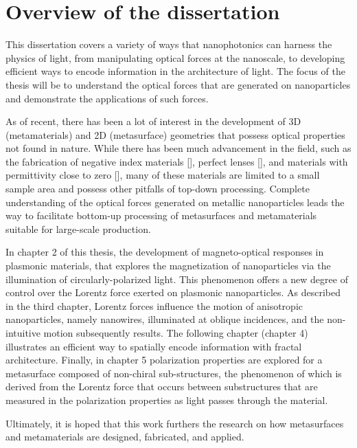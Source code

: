 \section{Overview of the dissertation}
This dissertation covers a variety of ways that nanophotonics can harness the physics of light, from manipulating optical forces at the nanoscale, to developing efficient ways to encode information in the architecture of light. The focus of the thesis will be to understand the optical forces that are generated on nanoparticles and demonstrate the applications of such forces. 

As of recent, there has been a lot of interest in the development of 3D (metamaterials) and 2D (metasurface) geometries that possess optical properties not found in nature. While there has been much advancement in the field, such as the fabrication of negative index materials [\cite{Padilla:2006, Dolling:07, shelby:489}], perfect lenses [\cite{Khorasaninejad:2016, Yang:14, Khorasaninejad1190}], and materials with permittivity close to zero [\cite{JPark:2015c, Alu:07}], many of these materials are limited to a small sample area and possess other pitfalls of top-down processing. Complete understanding of the optical forces generated on metallic nanoparticles leads the way to facilitate bottom-up processing of metasurfaces and metamaterials suitable for large-scale production.

In chapter 2 of this thesis, the development of magneto-optical responses in plasmonic materials, that explores the magnetization of nanoparticles via the illumination of circularly-polarized light. This phenomenon offers a new degree of control over the Lorentz force exerted on plasmonic nanoparticles. As described in the third chapter, Lorentz forces influence the motion of anisotropic nanoparticles, namely nanowires, illuminated at oblique incidences, and the non-intuitive motion subsequently results. The following chapter (chapter 4) illustrates an efficient way to spatially encode information with fractal architecture. Finally, in chapter 5 polarization properties are explored for a metasurface composed of non-chiral sub-structures, the phenomenon of which is derived from the Lorentz force that occurs between substructures that are measured in the polarization properties as light passes through the material.

Ultimately, it is hoped that this work furthers the research on how metasurfaces and metamaterials are designed, fabricated, and applied.

